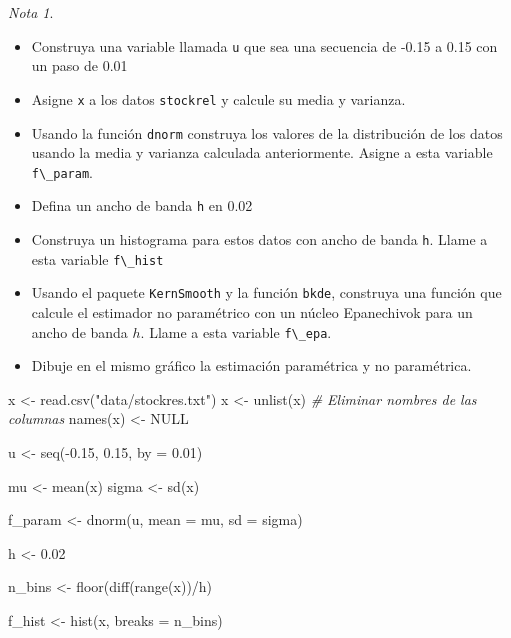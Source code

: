 \documentclass[
  12pt,
]{book}
\newenvironment{Shaded}{\begin{snugshade}}{\end{snugshade}}
\newcommand{\AttributeTok}[1]{\textcolor[rgb]{0.77,0.63,0.00}{#1}}
\newcommand{\CommentTok}[1]{\textcolor[rgb]{0.56,0.35,0.01}{\textit{#1}}}
\newcommand{\ConstantTok}[1]{\textcolor[rgb]{0.00,0.00,0.00}{#1}}
\newcommand{\FloatTok}[1]{\textcolor[rgb]{0.00,0.00,0.81}{#1}}
\newcommand{\FunctionTok}[1]{\textcolor[rgb]{0.00,0.00,0.00}{#1}}
\newcommand{\NormalTok}[1]{#1}
\newcommand{\OtherTok}[1]{\textcolor[rgb]{0.56,0.35,0.01}{#1}}
\newcommand{\SpecialCharTok}[1]{\textcolor[rgb]{0.00,0.00,0.00}{#1}}
\newcommand{\StringTok}[1]{\textcolor[rgb]{0.31,0.60,0.02}{#1}}
\providecommand{\tightlist}{%
  \setlength{\itemsep}{0pt}\setlength{\parskip}{0pt}}
\theoremstyle{definition}
\theoremstyle{definition}
\theoremstyle{definition}
\theoremstyle{definition}
\theoremstyle{remark}
\newtheorem*{remark}{Nota}
\begin{document}
\begin{remark}

\begin{itemize}
\tightlist
\item
  Construya una variable llamada \texttt{u} que sea una secuencia de -0.15 a 0.15 con un paso de 0.01
\item
  Asigne \texttt{x} a los datos \texttt{stockrel} y calcule su media y varianza.
\item
  Usando la función \texttt{dnorm} construya los valores de la distribución de los datos usando la media y varianza calculada anteriormente. Asigne a esta variable \texttt{f\textbackslash{}\_param}.
\item
  Defina un ancho de banda \texttt{h} en 0.02
\item
  Construya un histograma para estos datos con ancho de banda \texttt{h}. Llame a esta variable \texttt{f\textbackslash{}\_hist}
\item
  Usando el paquete \texttt{KernSmooth} y la función \texttt{bkde}, construya una función que calcule el estimador no paramétrico con un núcleo Epanechivok para un ancho de banda \(h\). Llame a esta variable \texttt{f\textbackslash{}\_epa}.
\item
  Dibuje en el mismo gráfico la estimación paramétrica y no paramétrica.
\end{itemize}

\end{remark}

\begin{Shaded}
\begin{Highlighting}[]
\NormalTok{x }\OtherTok{\textless{}{-}} \FunctionTok{read.csv}\NormalTok{(}\StringTok{"data/stockres.txt"}\NormalTok{)}
\NormalTok{x }\OtherTok{\textless{}{-}} \FunctionTok{unlist}\NormalTok{(x)}
\CommentTok{\# Eliminar nombres de las columnas}
\FunctionTok{names}\NormalTok{(x) }\OtherTok{\textless{}{-}} \ConstantTok{NULL}

\NormalTok{u }\OtherTok{\textless{}{-}} \FunctionTok{seq}\NormalTok{(}\SpecialCharTok{{-}}\FloatTok{0.15}\NormalTok{, }\FloatTok{0.15}\NormalTok{, }\AttributeTok{by =} \FloatTok{0.01}\NormalTok{)}

\NormalTok{mu }\OtherTok{\textless{}{-}} \FunctionTok{mean}\NormalTok{(x)}
\NormalTok{sigma }\OtherTok{\textless{}{-}} \FunctionTok{sd}\NormalTok{(x)}

\NormalTok{f\_param }\OtherTok{\textless{}{-}} \FunctionTok{dnorm}\NormalTok{(u, }\AttributeTok{mean =}\NormalTok{ mu, }\AttributeTok{sd =}\NormalTok{ sigma)}

\NormalTok{h }\OtherTok{\textless{}{-}} \FloatTok{0.02}

\NormalTok{n\_bins }\OtherTok{\textless{}{-}} \FunctionTok{floor}\NormalTok{(}\FunctionTok{diff}\NormalTok{(}\FunctionTok{range}\NormalTok{(x))}\SpecialCharTok{/}\NormalTok{h)}

\NormalTok{f\_hist }\OtherTok{\textless{}{-}} \FunctionTok{hist}\NormalTok{(x, }\AttributeTok{breaks =}\NormalTok{ n\_bins)}
\end{Highlighting}
\end{Shaded}
\end{document}
